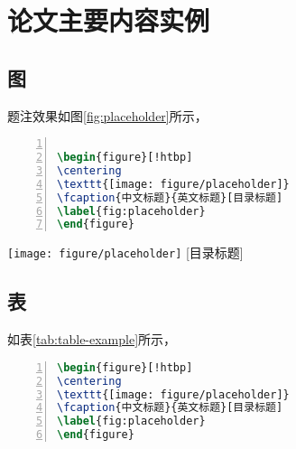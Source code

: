 
\chapter{论文主要内容实例}



\section{图}

题注效果如图\ref{fig:placeholder}所示，

\begin{lstlisting}[language=tex, label=lst:helloworld, caption=图-题注代码, numbers=left, basicstyle=\ttfamily]

\begin{figure}[!htbp]
\centering
\texttt{[image: figure/placeholder]}
\fcaption{中文标题}{英文标题}[目录标题]
\label{fig:placeholder}
\end{figure}

\end{lstlisting}


\begin{figure*}[!htbp]
	\centering
	\texttt{[image: figure/placeholder]}
	[目录标题]
	\label{fig:placeholder}
\end{figure*}

\section{表}

如表\ref{tab:table-example}所示，


\begin{lstlisting}[language=tex, label=lst:helloworld, caption=表-题注代码, numbers=left, basicstyle=\ttfamily]
\begin{figure}[!htbp]
\centering
\texttt{[image: figure/placeholder]}
\fcaption{中文标题}{英文标题}[目录标题]
\label{fig:placeholder}
\end{figure}
\end{lstlisting}



